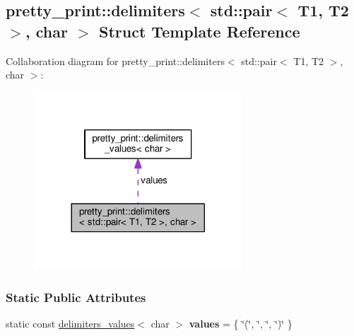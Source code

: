 \hypertarget{structpretty__print_1_1delimiters_3_01std_1_1pair_3_01T1_00_01T2_01_4_00_01char_01_4}{}\subsection{pretty\+\_\+print\+:\+:delimiters$<$ std\+:\+:pair$<$ T1, T2 $>$, char $>$ Struct Template Reference}
\label{structpretty__print_1_1delimiters_3_01std_1_1pair_3_01T1_00_01T2_01_4_00_01char_01_4}


Collaboration diagram for pretty\+\_\+print\+:\+:delimiters$<$ std\+:\+:pair$<$ T1, T2 $>$, char $>$\+:
\nopagebreak
\begin{figure}[H]
\begin{center}
\leavevmode
\includegraphics[width=221pt]{structpretty__print_1_1delimiters_3_01std_1_1pair_3_01T1_00_01T2_01_4_00_01char_01_4__coll__graph}
\end{center}
\end{figure}
\subsubsection*{Static Public Attributes}
\begin{DoxyCompactItemize}
\item 
static const \hyperlink{structpretty__print_1_1delimiters__values}{delimiters\+\_\+values}$<$ char $>$ {\bfseries values} = \{ \char`\"{}(\char`\"{}, \char`\"{}, \char`\"{}, \char`\"{})\char`\"{} \}\hypertarget{structpretty__print_1_1delimiters_3_01std_1_1pair_3_01T1_00_01T2_01_4_00_01char_01_4_a5e1e43a6d103b3cea1af27c53cb9babd}{}\label{structpretty__print_1_1delimiters_3_01std_1_1pair_3_01T1_00_01T2_01_4_00_01char_01_4_a5e1e43a6d103b3cea1af27c53cb9babd}

\end{DoxyCompactItemize}


